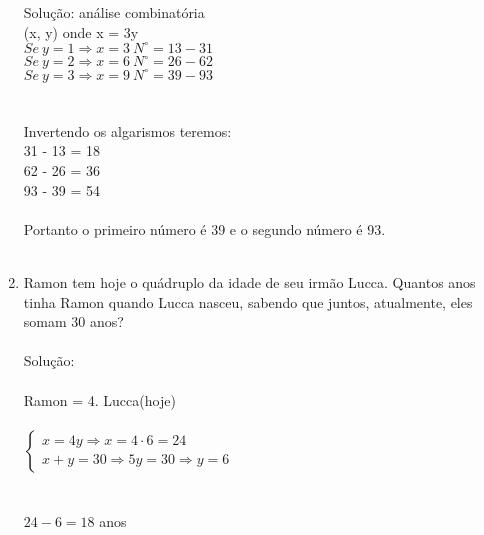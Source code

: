 \documentclass[a4paper,14pt]{article}
\begin{document}
\begin{multicols}{2}
\begin{enumerate}
        Solução: análise combinatória \\
        (x, y) onde x = 3y \\

        	$Se~y = 1 \Rightarrow x = 3~N^\circ = 13 - 31$ \\
        	$Se~y = 2 \Rightarrow x = 6~N^\circ = 26 - 62$ \\
        	$Se~y = 3 \Rightarrow x = 9~N^\circ = 39 - 93$ \\
            \\ \\
        Invertendo os algarismos teremos: \\
        31 - 13 = 18 \\
        62 - 26 = 36 \\
        93 - 39 = 54 \\ \\
        Portanto o primeiro número é 39 e o segundo número é 93. \\\\

        \item Ramon tem hoje o quádruplo da idade de seu irmão Lucca. Quantos anos tinha Ramon quando Lucca nasceu, sabendo que juntos, atualmente, eles somam 30 anos?\\\\
        Solução: \\\\
        Ramon = 4. Lucca(hoje) \\ \\
        $\begin{cases}
        	x = 4y \Rightarrow x = 4 \cdot 6 = 24 \\
        	x + y = 30 \Rightarrow 5y = 30 \Rightarrow y = 6
        \end{cases}$ \\\\\\
        $24 - 6 = 18$ anos
        

\end{enumerate}
\end{multicols}
\end{document}
